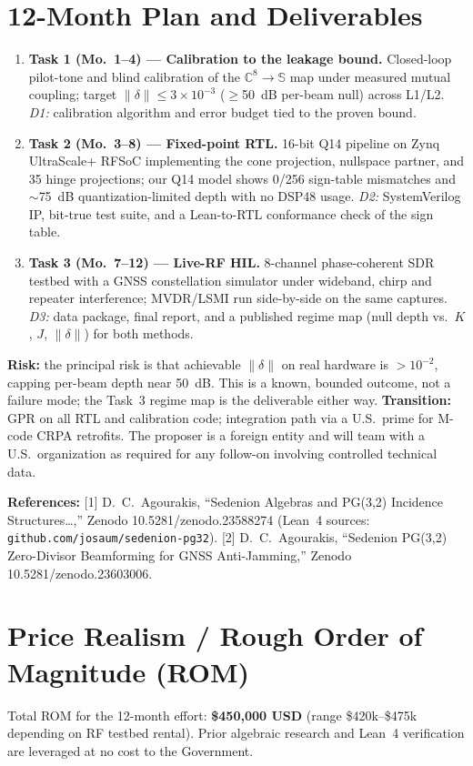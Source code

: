 \documentclass[12pt,letterpaper]{article}
\begin{document}
\section{12-Month Plan and Deliverables}
\begin{enumerate}[leftmargin=16pt,itemsep=1pt,topsep=1pt]
    \item \textbf{Task 1 (Mo.\ 1--4) --- Calibration to the leakage bound.} Closed-loop pilot-tone and blind calibration of the $\mathbb{C}^8\!\to\!\mathbb{S}$ map under measured mutual coupling; target $\|\delta\|\le 3\times10^{-3}$ ($\ge$50~dB per-beam null) across L1/L2. \textit{D1:} calibration algorithm and error budget tied to the proven bound.
    \item \textbf{Task 2 (Mo.\ 3--8) --- Fixed-point RTL.} 16-bit Q14 pipeline on Zynq UltraScale+ RFSoC implementing the cone projection, nullspace partner, and 35 hinge projections; our Q14 model shows 0/256 sign-table mismatches and $\sim$75~dB quantization-limited depth with no DSP48 usage. \textit{D2:} SystemVerilog IP, bit-true test suite, and a Lean-to-RTL conformance check of the sign table.
    \item \textbf{Task 3 (Mo.\ 7--12) --- Live-RF HIL.} 8-channel phase-coherent SDR testbed with a GNSS constellation simulator under wideband, chirp and repeater interference; MVDR/LSMI run side-by-side on the same captures. \textit{D3:} data package, final report, and a published regime map (null depth vs.\ $K$, $J$, $\|\delta\|$) for both methods.
\end{enumerate}
\textbf{Risk:} the principal risk is that achievable $\|\delta\|$ on real hardware is $>10^{-2}$, capping per-beam depth near 50~dB. This is a known, bounded outcome, not a failure mode; the Task~3 regime map is the deliverable either way. \textbf{Transition:} GPR on all RTL and calibration code; integration path via a U.S.\ prime for M-code CRPA retrofits. The proposer is a foreign entity and will team with a U.S.\ organization as required for any follow-on involving controlled technical data.

\textbf{References:} [1] D.\ C.\ Agourakis, ``Sedenion Algebras and PG(3,2) Incidence Structures\ldots,'' Zenodo 10.5281/zenodo.23588274 (Lean~4 sources: \texttt{github.com/josaum/sedenion-pg32}). [2] D.\ C.\ Agourakis, ``Sedenion PG(3,2) Zero-Divisor Beamforming for GNSS Anti-Jamming,'' Zenodo 10.5281/zenodo.23603006.

\newpage
\thispagestyle{empty}
\section*{Price Realism / Rough Order of Magnitude (ROM)}
Total ROM for the 12-month effort: \textbf{\$450,000 USD} (range \$420k--\$475k depending on RF testbed rental). Prior algebraic research and Lean~4 verification are leveraged at no cost to the Government.
\end{document}

